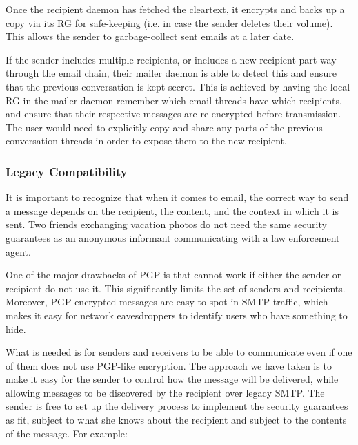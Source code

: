 Once the recipient daemon has fetched the cleartext, it encrypts and backs up a
copy via its RG for safe-keeping (i.e. in case the sender deletes their volume).
This allows the sender to garbage-collect sent emails at a later date.

If the sender includes multiple recipients, or includes a new recipient part-way
through the email chain, their mailer daemon is able to detect this and ensure
that the previous conversation is kept secret.  This is achieved by having the
local RG in the mailer daemon remember which email threads have which recipients,
and ensure that their respective messages are re-encrypted before transmission.
The user would need to explicitly copy and share any parts of the previous
conversation threads in order to expose them to the new recipient.

\subsubsection{Legacy Compatibility}

It is important to recognize that when it comes to email, the correct way to
send a message depends on the recipient, the content, and the context in which
it is sent.  Two friends exchanging vacation photos do not need the same
security guarantees as an anonymous informant communicating with a law
enforcement agent.

One of the major drawbacks of PGP is that cannot work if either the
sender or recipient do not use it.  This significantly limits the set of senders
and recipients.  Moreover, PGP-encrypted messages are easy to spot in SMTP
traffic, which makes it easy for network eavesdroppers to identify users who
have something to hide.

What is needed is for senders and receivers to be able to communicate even if
one of them does not use PGP-like encryption.  The approach we have taken is to
make it easy for the sender to control how the message will be delivered, while
allowing messages to be discovered by the recipient over legacy SMTP.  The
sender is free to set up the delivery process to implement the security
guarantees as fit, subject to what she knows about the recipient and subject to
the contents of the message.  For example:

